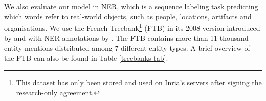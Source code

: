 \begin{table}[ht]
    \centering\small
    \caption{Statistics on the treebanks used in POS tagging, dependency parsing, and NER (FTB).}\label{treebanks-tab}
\end{table}

We also evaluate our model in NER, which is a sequence labeling task predicting which words refer to real-world objects, such as people, locations, artifacts and organisations. We use the French Treebank\footnote{This dataset has only been stored and used on Inria's servers after signing the research-only agreement.} (FTB) \citep{abeille:03} in its 2008 version introduced by \citet{cc-clustering:09short} and with NER annotations by \citet{sagot2012annotation}. The FTB contains more than 11 thousand entity mentions distributed among 7 different entity types. A brief overview of the FTB can also be found in Table \ref{treebanks-tab}.

